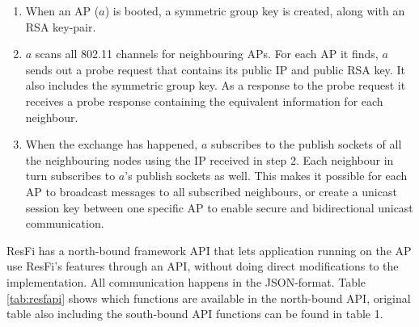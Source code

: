 \begin{enumerate}
	\item When an AP ($a$) is booted, a symmetric group key is created, along with an RSA key-pair. 
	\item $a$ scans all 802.11 channels for neighbouring APs. For each AP it finds, $a$ sends out a probe request that contains its public IP and public RSA key. It also includes
		the symmetric group key. As a response to the probe request it receives a probe response containing the equivalent information for each neighbour. 
	\item When the exchange has happened, $a$ subscribes to the publish sockets of all the neighbouring nodes using the IP received in step 2. Each neighbour in turn subscribes to $a$'s
		publish sockets as well. This makes it possible for each AP to broadcast messages to all subscribed neighbours,
		or create a unicast session key between one specific AP to enable secure and bidirectional unicast communication.
\end{enumerate}

ResFi has a north-bound framework API that lets application running on the AP use ResFi's features through an API, without doing direct modifications to the implementation. All communication happens
in the JSON-format. Table \ref{tab:resfapi} shows which functions are available in the north-bound API, original table also including the south-bound API functions can be found in \cite{resfi} table 1.

